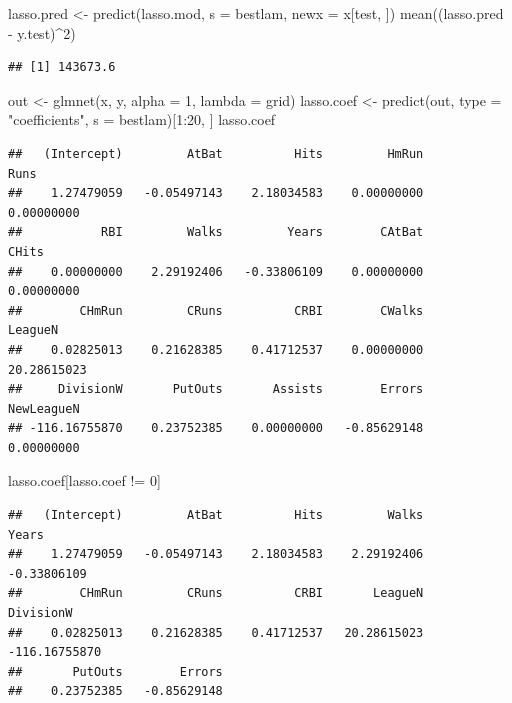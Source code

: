 \documentclass[
  12pt,
]{book}
\newenvironment{Shaded}{\begin{snugshade}}{\end{snugshade}}
\newcommand{\AttributeTok}[1]{\textcolor[rgb]{0.77,0.63,0.00}{#1}}
\newcommand{\DecValTok}[1]{\textcolor[rgb]{0.00,0.00,0.81}{#1}}
\newcommand{\FunctionTok}[1]{\textcolor[rgb]{0.00,0.00,0.00}{#1}}
\newcommand{\NormalTok}[1]{#1}
\newcommand{\OtherTok}[1]{\textcolor[rgb]{0.56,0.35,0.01}{#1}}
\newcommand{\SpecialCharTok}[1]{\textcolor[rgb]{0.00,0.00,0.00}{#1}}
\newcommand{\StringTok}[1]{\textcolor[rgb]{0.31,0.60,0.02}{#1}}
\theoremstyle{definition}
\theoremstyle{definition}
\theoremstyle{definition}
\theoremstyle{remark}
\begin{document}
\begin{Shaded}
\begin{Highlighting}[]
\NormalTok{lasso.pred }\OtherTok{\textless{}{-}} \FunctionTok{predict}\NormalTok{(lasso.mod, }\AttributeTok{s =}\NormalTok{ bestlam, }\AttributeTok{newx =}\NormalTok{ x[test, }
\NormalTok{    ])}
\FunctionTok{mean}\NormalTok{((lasso.pred }\SpecialCharTok{{-}}\NormalTok{ y.test)}\SpecialCharTok{\^{}}\DecValTok{2}\NormalTok{)}
\end{Highlighting}
\end{Shaded}

\begin{verbatim}
## [1] 143673.6
\end{verbatim}

\begin{Shaded}
\begin{Highlighting}[]
\NormalTok{out }\OtherTok{\textless{}{-}} \FunctionTok{glmnet}\NormalTok{(x, y, }\AttributeTok{alpha =} \DecValTok{1}\NormalTok{, }\AttributeTok{lambda =}\NormalTok{ grid)}
\NormalTok{lasso.coef }\OtherTok{\textless{}{-}} \FunctionTok{predict}\NormalTok{(out, }\AttributeTok{type =} \StringTok{"coefficients"}\NormalTok{, }\AttributeTok{s =}\NormalTok{ bestlam)[}\DecValTok{1}\SpecialCharTok{:}\DecValTok{20}\NormalTok{, }
\NormalTok{    ]}
\NormalTok{lasso.coef}
\end{Highlighting}
\end{Shaded}

\begin{verbatim}
##   (Intercept)         AtBat          Hits         HmRun          Runs 
##    1.27479059   -0.05497143    2.18034583    0.00000000    0.00000000 
##           RBI         Walks         Years        CAtBat         CHits 
##    0.00000000    2.29192406   -0.33806109    0.00000000    0.00000000 
##        CHmRun         CRuns          CRBI        CWalks       LeagueN 
##    0.02825013    0.21628385    0.41712537    0.00000000   20.28615023 
##     DivisionW       PutOuts       Assists        Errors    NewLeagueN 
## -116.16755870    0.23752385    0.00000000   -0.85629148    0.00000000
\end{verbatim}

\begin{Shaded}
\begin{Highlighting}[]
\NormalTok{lasso.coef[lasso.coef }\SpecialCharTok{!=} \DecValTok{0}\NormalTok{]}
\end{Highlighting}
\end{Shaded}

\begin{verbatim}
##   (Intercept)         AtBat          Hits         Walks         Years 
##    1.27479059   -0.05497143    2.18034583    2.29192406   -0.33806109 
##        CHmRun         CRuns          CRBI       LeagueN     DivisionW 
##    0.02825013    0.21628385    0.41712537   20.28615023 -116.16755870 
##       PutOuts        Errors 
##    0.23752385   -0.85629148
\end{verbatim}
\end{document}
